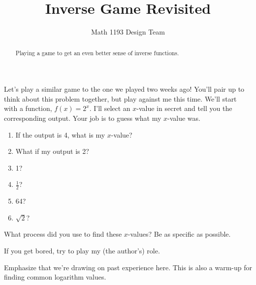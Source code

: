 \documentclass[noauthor]{ximera}
\title{Inverse Game Revisited}
\author{Math 1193 Design Team}
\begin{document}
\begin{abstract}
    Playing a game to get an even better sense of inverse functions.
\end{abstract}
\maketitle

Let's play a similar game to the one we played two weeks ago! 
You'll pair up to think about this problem together, but play against me this time.
We'll start with a function, 
\(f\left(x\right)=2^x\). I'll select an \(x\)-value in secret and 
tell you the corresponding output. Your job is to guess what my 
\(x\)-value was. 

\begin{enumerate}
    \item If the output is 4, what is my \(x\)-value?
    \item What if my output is 2?
    \item 1?
    \item \(\frac{1}{2}\)?
    \item 64?
    \item \(\sqrt{2}\)?
\end{enumerate}

What process did you use to find these \(x\)-values? Be as specific as possible.

If you get bored, try to play my (the author's) role.

\begin{instructorNotes}
Emphasize that we're drawing on past experience here. This is also a 
warm-up for finding common logarithm values.
\end{instructorNotes}
\end{document}
